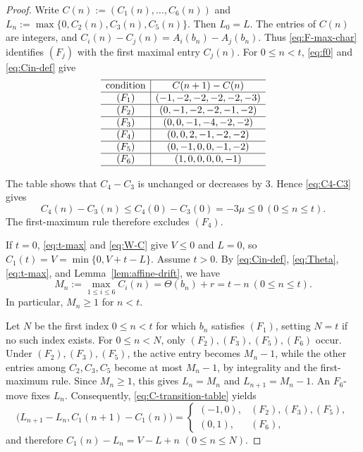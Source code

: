 \documentclass[11pt,reqno]{amsart}
\numberwithin{table}{section}
\numberwithin{equation}{section}
\theoremstyle{plain}
\theoremstyle{definition}
\begin{document}
\begin{proof}
	Write $C(n):=(C_1(n),\ldots,C_6(n))$ and $L_n:=\max\{0,C_2(n),C_3(n),C_5(n)\}$.
	Then \(L_0=L\).
	The entries of \(C(n)\) are integers, and
	\(C_i(n)-C_j(n)=A_i(b_n)-A_j(b_n)\).
	Thus \eqref{eq:F-max-char} identifies \((F_j)\) with the
	first maximal entry \(C_j(n)\).
	For \(0\le n<t\), \eqref{eq:f0} and \eqref{eq:Cin-def} give
	\begin{equation}\label{eq:C-transition-table}
		\begin{array}{c|c}\hline
			\text{condition}&C(n+1)-C(n)\\ \hline
			(F_1)&(-1,-2,-2,-2,-2,-3)\\ \hline
			(F_2)&(0,-1,-2,-2,-1,-2)\\ \hline
			(F_3)&(0,0,-1,-4,-2,-2)\\ \hline
			(F_4)&(0,0,2,-1,-2,-2)\\ \hline
			(F_5)&(0,-1,0,0,-1,-2)\\ \hline
			(F_6)&(1,0,0,0,0,-1)\\ \hline
		\end{array}
	\end{equation}
	
	The table shows that \(C_4-C_3\) is unchanged or decreases
	by \(3\).  Hence \eqref{eq:C4-C3} gives
	\[
	C_4(n)-C_3(n)
	\le C_4(0)-C_3(0)
	=-3\mu\le0
	\ (0\le n\le t).
	\]
	The first-maximum rule therefore excludes \((F_4)\).
	
	If \(t=0\), \eqref{eq:t-max} and \eqref{eq:W-C} give
	\(V\le0\) and \(L=0\), so
	\(C_1(t)=V=\min\{0,V+t-L\}\).
	Assume \(t>0\).
	By \eqref{eq:Cin-def}, \eqref{eq:Theta},
	\eqref{eq:t-max}, and Lemma~\ref{lem:affine-drift}, we have
	\begin{equation}\label{eq:C-max-tn}
		M_n
		:=
		\max_{1\le i\le6}C_i(n)
		=
		\Theta(b_n)+r
		=
		t-n
		\ (0\le n\le t).
	\end{equation}
	In particular, \(M_n\ge1\) for \(n<t\).
	
	Let \(N\) be the first index \(0\le n<t\) for which
	\(b_n\) satisfies \((F_1)\), setting \(N=t\) if no such
	index exists.
	For \(0\le n<N\), only
	\((F_2),(F_3),(F_5),(F_6)\) occur.
	Under \((F_2),(F_3),(F_5)\), the active entry becomes
	\(M_n-1\), while the other entries among \(C_2,C_3,C_5\)
	become at most \(M_n-1\), by integrality and the
	first-maximum rule.
	Since \(M_n\ge1\), this gives
	\(L_n=M_n\) and \(L_{n+1}=M_n-1\).
	An \(F_6\)-move fixes \(L_n\).
	Consequently, \eqref{eq:C-transition-table} yields
	\[
	\bigl(L_{n+1}-L_n,C_1(n+1)-C_1(n)\bigr)
	=
	\begin{cases}
		(-1,0),&(F_2),(F_3),(F_5),\\
		(0,1),&(F_6),
	\end{cases}
	\]
	and therefore $C_1(n)-L_n=V-L+n$ $(0\le n\le N)$.
	

\end{proof}
\end{document}
